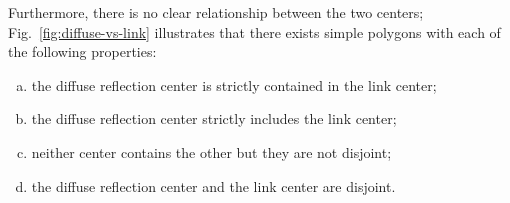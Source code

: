 \documentclass[12pt]{article}
\begin{document}
Furthermore, there is no clear relationship between the two centers;
Fig.~\ref{fig:diffuse-vs-link} illustrates that there exists simple polygons
with each of the following properties:
\begin{enumerate}[(a)] \itemsep2pt
\item the diffuse reflection center is strictly contained in the link center;
\item the diffuse reflection center strictly includes the link center;
\item neither center contains the other but they are not disjoint;
\item the diffuse reflection center and the link center are disjoint.
\end{enumerate}




\end{document}
